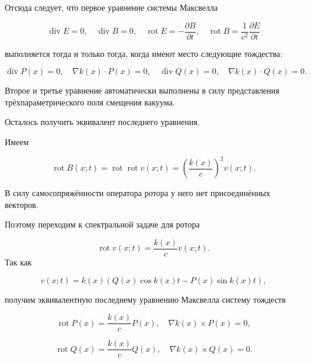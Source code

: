 Отсюда следует, что  первое уравнение системы Максвелла

$$

\mathop{\mathrm{div}} E = 0,

\quad  

\mathop{\mathrm{div}} B = 0,

\quad  

\mathop{\mathrm{rot}} E = - \frac{\partial B}{\partial t}, 

\quad 

\mathop{\mathrm{rot}} B = \frac{1}{c^2} \frac{\partial E}{\partial t}

$$

выполняется тогда и только тогда, когда имеют место следующие тождества:

$$

\mathop{\mathrm{div}} P(x) = 0,\quad  \nabla k(x)\cdot P(x) = 0,\quad \mathop{\mathrm{div}} Q(x) = 0,\quad  \nabla k(x)\cdot Q(x) = 0.

$$ 

Второе и третье уравнение автоматически выполнены в силу представления трёхпараметрического поля смещения вакуума. 

Осталось получить эквивалент последнего уравнения.

Имеем

$$

 \mathop{\mathrm{rot}} B(x;t) = \mathop{\mathrm{rot}} \mathop{\mathrm{rot}} v(x;t) = \left(\frac{k(x)}{c}\right)^2 v(x;t).

$$

В силу самосопряжённости оператора ротора у него нет присоединённых векторов. 

Поэтому переходим к спектральной задаче для ротора 

$$\mathop{\mathrm{rot}} v(x;t) = \frac{k(x)}{c} v(x;t).$$ Так как 

$$

v(x;t) = k(x)(Q(x)\cos k(x)t - P(x)\sin k(x)t),

$$  

получим эквивалентную последнему уравнению Максвелла систему тождеств

$$

\mathop{\mathrm{rot}} P(x) = \frac{k(x)}{c}P(x), \quad  \nabla k(x)\times P(x) = 0, $$

$$

\mathop{\mathrm{rot}} Q(x) = \frac{k(x)}{c}Q(x), \quad  \nabla k(x)\times Q(x) = 0.

$$

